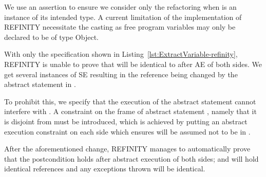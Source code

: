 
We use an assertion to ensure we consider only the refactoring when  is an instance of its intended type.
A current limitation of the implementation of REFINITY necessitate the casting  as free program variables may only be declared to be of type Object.

With only the specification shown in Listing~\ref{lst:ExtractVariable-refinity}, REFINITY is unable to prove that  will be identical to  after AE of both sides.
We get several instances of SE resulting in the reference  being changed by the abstract statement  in .

To prohibit this, we specify that the execution of the abstract statement  cannot interfere with .
A constraint on the frame  of abstract statement ,
namely that it is disjoint from  must be introduced, which is
achieved by putting an abstract execution constraint  on each side which ensures 
will be assumed not to be in .

After the aforementioned change, REFINITY manages to automatically prove that the postcondition holds after abstract execution of both sides;
 and  will hold identical references and any exceptions thrown will be identical.

